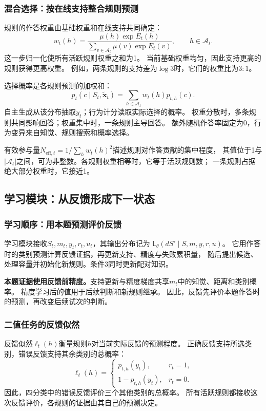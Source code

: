 \documentclass[11pt,a4paper]{article}
\numberwithin{equation}{section}
\newcommand{\A}{\mathcal{A}}
\newcommand{\Ll}{\mathsf{L}}
\begin{document}
\subsubsection{混合选择：按在线支持整合规则预测}
规则的作答权重由基础权重和在线支持共同确定：
\begin{equation}
w_t(h)=\frac{\mu(h)\exp E_t(h)}
{\sum_{v\in\A_t}\mu(v)\exp E_t(v)},\qquad h\in\A_t.
\label{eq:weights}
\end{equation}
这一步归一化使所有活跃规则权重之和为1。
当前基础权重均匀，因此支持更高的规则获得更高权重。
例如，两条规则的支持差为$\log 3$时，它们的权重比为$3:1$。

选择概率是各规则预测的加权和：
\begin{equation}
p_t(c\mid S_t,\widetilde{\bm x}_t)=\sum_{h\in\A_t}w_t(h)p_{t,h}(c).
\label{eq:choice}
\end{equation}
自主生成从该分布抽取$y_t$；行为计分读取实际选择的概率。
权重分散时，多条规则共同影响回答；权重集中时，一条规则主导回答。
额外随机作答率固定为0，行为变异来自知觉、规则搜索和概率选择。

有效参与量$N_{\mathrm{eff},t}=1/\sum_h w_t(h)^2$描述规则对作答贡献的集中程度，
其值位于1与$|\A_t|$之间，可为非整数。各规则权重相等时，它等于活跃规则数；
一条规则占据绝大部分权重时，它接近1。

\subsection{学习模块：从反馈形成下一状态}
\label{sec:learning}

\subsubsection{学习顺序：用本题预测评价反馈}
学习模块接收$S_t,m_t,y_t,r_t,u_t$，其输出分布记为
$\Ll_\theta(dS'\mid S,m,y,r,u)$。
它用作答时的类别预测计算反馈证据，再更新支持、精度与失败累积量，
随后提出候选、处理容量并初始化新规则。条件3同时更新配对知识。

\textbf{本题证据使用反馈前精度。}支持更新与精度梯度共享$m_t$中的知觉、距离和类别概率。
精度学习后的值用于后续判断和新规则继承。
因此，反馈先评价本题作答时的预测，再改变后续试次的判断。

\subsubsection{二值任务的反馈似然}
反馈似然$\ell_t(h)$衡量规则$h$对当前实际反馈的预测程度。
正确反馈支持所选类别，错误反馈支持其余类别的总概率：
\begin{equation}
\ell_t(h)=
\begin{cases}
p_{t,h}(y_t),&r_t=1,\\
1-p_{t,h}(y_t),&r_t=0.
\end{cases}
\label{eq:binary-feedback}
\end{equation}
因此，四分类中的错误反馈评价三个其他类别的总概率。
所有活跃规则都接收这次反馈评价，各规则的证据由其自己的预测决定。
\end{document}
